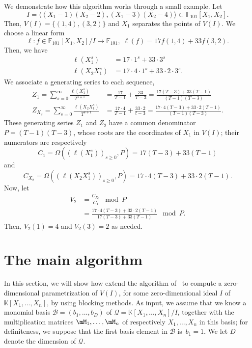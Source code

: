 \documentclass[12pt]{article}
\newcommand{\basis}{\mathscr{B}}
\newcommand{\minpoly}{P}
\newcommand{\residueI}{\mathscr{Q}}
\def\F {\ensuremath{\mathbb{F}}}
\def\K{\mathbb{K}}
\def\K {\ensuremath{\mathbb{K}}}
\begin{document}
We demonstrate how this algorithm works through a small example. Let 
$$I = \langle (X_1-1)(X_2-2),(X_1-3)(X_2-4)\rangle \subset
\F_{101}[X_1,X_2].$$ Then, $V(I) = \{ (1,4),(3,2) \}$ and $X_1$ separates the
points of $V(I)$. We choose a  linear form 
$$\ell: f \in \F_{101}[X_1,X_2]/I \to \F_{101},\;\ell(f) = 17 f(1,4) + 33 f(3,2).$$
Then, we have
\begin{align*}
\ell(X_1^s) &= 17 \cdot 1^s + 33 \cdot 3^s\\
\ell(X_2X_1^s) &= 17 \cdot 4 \cdot 1^s + 33 \cdot 2 \cdot 3^s.
\end{align*} 
We associate a generating series to each sequence,
\begin{align*}
Z_1 = \sum_{s = 0}^{\infty} \frac{\ell(X^s_1)}{T^{s+1}}
&= \frac{17}{T-1} + \frac{33}{T-3}
= \frac{17(T-3)+33(T-1)}{(T-1)(T-3)} \\
Z_{X_2} = \sum_{s=0}^{\infty} \frac{\ell(X_2X_1^s)}{T^{s+1} }
&= \frac{17\cdot 4}{T-1} + \frac{33 \cdot 2}{t-3}
= \frac{17\cdot 4 (T-3) + 33\cdot 2(T-1)}{(T-1)(T-3)}.
\end{align*}
These generating series $Z_1$ and $Z_2$ have a common denominator $\minpoly = (T-1)(T-3)$,
whose roots are the coordinates of $X_1$ in $V(I)$;
their numerators are respectively
$$C_{1} = \Omega((\ell(X^s_1))_{s\ge 0},\minpoly) = 17 (T-3) + 33(T-1)$$
and
$$C_{X_2} = \Omega((\ell(X_2X^s_1))_{s\ge 0},\minpoly) = 17\cdot 4 (T-3) + 33\cdot 2(T-1).$$
Now, let
\begin{align*}
V_2 
&=\frac{C_{X_2}}{C_1} \mod \minpoly\\
&=\frac{17\cdot 4 (T-3) + 33\cdot 2(T-1)}{17(T-3)+33(T-1)} \mod \minpoly.
\end{align*}
Then, $ V_2(1) = 4$ and $V_2(3) = 2$ as needed.


\section{The main algorithm}\label{sec:main}

In this section, we will show how extend the algorithm
of~\cite{BoSaSc03} to compute a zero-dimensional parametrization of
$V(I)$, for some zero-dimensional ideal $I$ of $\K[X_1,\dots,X_n]$, by
using blocking methods. As input, we assume that we know a monomial
basis $\basis=(b_1,\dots,b_D)$ of $\residueI=\K[X_1,\dots,X_n]/I$, together with the
multiplication matrices $\mM_1,\dots,\mM_n$ of respectively
$X_1,\dots,X_n$ in this basis; for definiteness, we suppose that the
first basis element in $\basis$ is~$b_1=1$. We let $D$ denote the 
dimension of $\residueI$.
\end{document}
